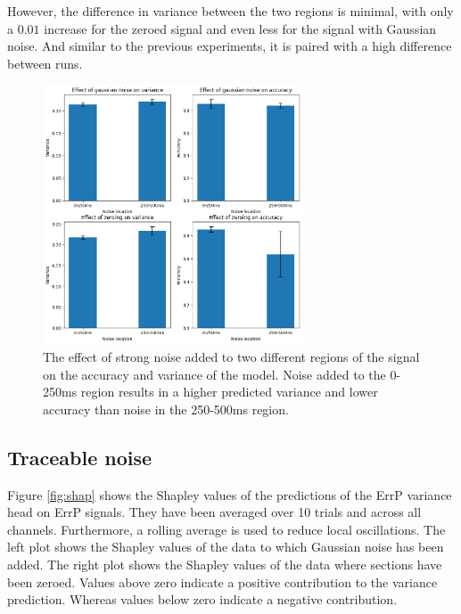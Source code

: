 However, the difference in variance between the two regions is minimal, with only a $0.01$ increase for the zeroed signal and even less for the signal with Gaussian noise. And similar to the previous experiments, it is paired with a high difference between runs.

\begin{figure}[!tbp]
    \centering
        \includegraphics[width=7.7cm]{img/local.png}
    \caption{The effect of strong noise added to two different regions of the signal on the accuracy and variance of the model. Noise added to the 0-250ms region results in a higher predicted variance and lower accuracy than noise in the 250-500ms region.}
    \label{fig:local}
\end{figure}

\subsection{Traceable noise}

Figure \ref{fig:shap} shows the Shapley values of the predictions of the ErrP variance head on ErrP signals. They have been averaged over 10 trials and across all channels. Furthermore, a rolling average is used to reduce local oscillations. The left plot shows the Shapley values of the data to which Gaussian noise has been added. The right plot shows the Shapley values of the data where sections have been zeroed. Values above zero indicate a positive contribution to the variance prediction. Whereas values below zero indicate a negative contribution.

